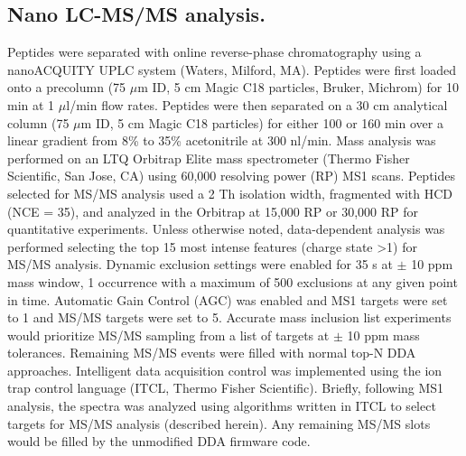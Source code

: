 \subsection*{Nano LC-MS/MS analysis.}
Peptides were separated with online reverse-phase chromatography using a nanoACQUITY UPLC system (Waters, Milford, MA). Peptides were first loaded onto a precolumn (75 $\mu$m ID, 5 cm Magic C18 particles, Bruker, Michrom) for 10 min at 1 $\mu$l/min flow rates. Peptides were then separated on a 30 cm analytical column (75 $\mu$m ID, 5 cm Magic C18 particles) for either 100 or 160 min over a linear gradient from 8\% to 35\% acetonitrile at 300 nl/min. Mass analysis was performed on an LTQ Orbitrap Elite mass spectrometer (Thermo Fisher Scientific, San Jose, CA) using 60,000 resolving power (RP) MS1 scans.\cite{orbielite} Peptides selected for MS/MS analysis used a 2 Th isolation width, fragmented with HCD (NCE = 35), and analyzed in the Orbitrap at 15,000 RP or 30,000 RP for quantitative experiments. Unless otherwise noted, data-dependent analysis was performed selecting the top 15 most intense \mz{} features (charge state >1) for MS/MS analysis. Dynamic exclusion settings were enabled for 35 s at $\pm$ 10 ppm mass window, 1 occurrence with a maximum of 500 exclusions at any given point in time. Automatic Gain Control (AGC) was enabled and MS1 targets were set to 1 and MS/MS targets were set to 5. Accurate mass inclusion list experiments would prioritize MS/MS sampling from a list of targets at $\pm$ 10 ppm mass tolerances. Remaining MS/MS events were filled with normal top-N DDA approaches. Intelligent data acquisition control was implemented using the ion trap control language (ITCL, Thermo Fisher Scientific). Briefly, following MS1 analysis, the spectra was analyzed using algorithms written in ITCL to select targets for MS/MS analysis (described herein). Any remaining MS/MS slots would be filled by the unmodified DDA firmware code.


